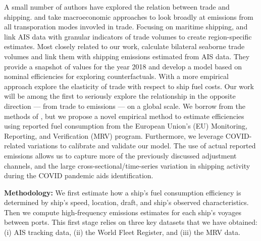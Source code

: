 \documentclass[hidelinks, 12pt,letterpaper]{article}
\begin{document}
A small number of authors have explored the relation between trade and shipping. \citet{cristea2013trade} and \citet{shapiro2016trade} take macroeconomic approaches to look broadly at emissions from all transporation modes invovled in trade. Focusing on maritime shipping, \citet{van2018spatially} and \citet{liu2019emissions} link AIS data with granular indicators of trade volumes to create region-specific estimates. Most closely related to our work, \citet{wang2021trade} calculate bilateral seaborne trade volumes and link them with shipping emissions estimated from AIS data. They provide a snapshot of values for the year 2018 and develop a model based on nominal efficiencies for exploring counterfactuals. With a more empirical approach \citet{brancaccio2018impact} explore the elasticity of trade with respect to ship fuel costs. Our work will be among the first to seriously explore the relationship in the opposite direction --- from trade to emissions --- on a global scale. We borrow from the methods of \citet{wang2021trade}, but we propose a novel empirical method to estimate efficiencies using reported fuel consumption from the European Union's (EU) Monitoring, Reporting, and Verification (MRV) program. Furthermore, we leverage COVID-related variations to calibrate and validate our model. The use of actual reported emissions allows us to capture more of the previously discussed adjustment channels, and the large cross-sectional/time-series variation in shipping activity during the COVID pandemic aids identification. %


\smallskip

\noindent \textbf{Methodology:}  We first estimate how a ship's fuel consumption efficiency is determined by ship's speed, location, draft, and ship's observed characteristics. Then we compute high-frequency emissions estimates for each ship's voyages between ports. This first stage relies on three key datasets that we have obtained: (i) AIS tracking data, (ii) the World Fleet Register, and (iii) the MRV data.
\end{document}
